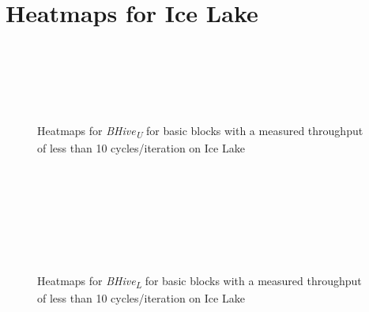 \documentclass[sigconf,nonacm]{acmart}
\newcommand{\bhivel}{\emph{BHive\textsubscript{L}}\xspace}
\newcommand{\bhiveu}{\emph{BHive\textsubscript{U}}\xspace}
\begin{document}
\section{Heatmaps for Ice Lake}
\vfill
\begin{figure}[H]
\centering
\begin{subfigure}[t]{0.33\textwidth}\end{subfigure}~
\begin{subfigure}[t]{0.33\textwidth}\end{subfigure}~
\begin{subfigure}[t]{0.33\textwidth}\end{subfigure}\par\bigskip

\begin{subfigure}[t]{0.33\textwidth}\end{subfigure}
~\begin{subfigure}[t]{0.33\textwidth}\end{subfigure}
\caption{Heatmaps for \bhiveu for basic blocks with a measured throughput of less than 10 cycles/iteration on Ice Lake}
\end{figure}
\vfill

\newpage
\vfill
\begin{figure}[H]
\centering
\begin{subfigure}[t]{0.33\textwidth}\end{subfigure}~
\begin{subfigure}[t]{0.33\textwidth}\end{subfigure}~
\begin{subfigure}[t]{0.33\textwidth}\end{subfigure}\par\bigskip

\begin{subfigure}[t]{0.33\textwidth}\end{subfigure}~
\begin{subfigure}[t]{0.33\textwidth}\end{subfigure}
~\begin{subfigure}[t]{0.33\textwidth}\end{subfigure}
\caption{Heatmaps for \bhivel for basic blocks with a measured throughput of less than 10 cycles/iteration on Ice Lake}
\end{figure}
\vfill
\end{document}
